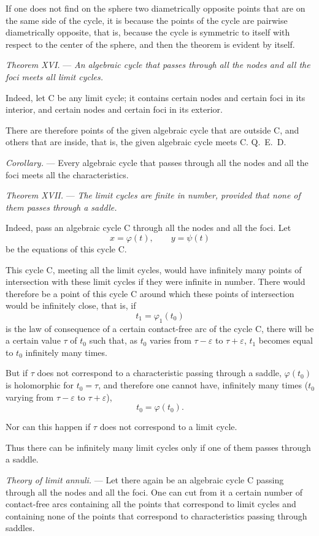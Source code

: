 \documentclass[11pt]{article}
\begin{document}
If one does not find on the sphere two diametrically opposite points that are on the same side of the cycle, it is because the points of the cycle are pairwise diametrically opposite, that is, because the cycle is symmetric to itself with respect to the center of the sphere, and then the theorem is evident by itself.

\emph{Theorem XVI.} --- \emph{An algebraic cycle that passes through all the nodes and all the foci meets all limit cycles.}

Indeed, let C be any limit cycle; it contains certain nodes and certain foci in its interior, and certain nodes and certain foci in its exterior.

There are therefore points of the given algebraic cycle that are outside C, and others that are inside, that is, the given algebraic cycle meets C. \hfill\mbox{Q. E. D.}

\emph{Corollary.} --- Every algebraic cycle that passes through all the nodes and all the foci meets all the characteristics.

\emph{Theorem XVII.} --- \emph{The limit cycles are finite in number, provided that none of them passes through a saddle.}

Indeed, pass an algebraic cycle C through all the nodes and all the foci. Let
\[
x=\varphi(t),\qquad y=\psi(t)
\]
be the equations of this cycle C.

This cycle C, meeting all the limit cycles, would have infinitely many points of intersection with these limit cycles if they were infinite in number. There would therefore be a point of this cycle C around which these points of intersection would be infinitely close, that is, if
\[
t_1=\varphi_1(t_0)
\]
is the law of consequence of a certain contact-free arc of the cycle C, there will be a certain value $\tau$ of $t_0$ such that, as $t_0$ varies from $\tau-\varepsilon$ to $\tau+\varepsilon$, $t_1$ becomes equal to $t_0$ infinitely many times.

But if $\tau$ does not correspond to a characteristic passing through a saddle, $\varphi(t_0)$ is holomorphic for $t_0=\tau$, and therefore one cannot have, infinitely many times ($t_0$ varying from $\tau-\varepsilon$ to $\tau+\varepsilon$),
\[
t_0=\varphi(t_0).
\]

Nor can this happen if $\tau$ does not correspond to a limit cycle.

Thus there can be infinitely many limit cycles only if one of them passes through a saddle.

\emph{Theory of limit annuli.} --- Let there again be an algebraic cycle C passing through all the nodes and all the foci. One can cut from it a certain number of contact-free arcs containing all the points that correspond to limit cycles and containing none of the points that correspond to characteristics passing through saddles.
\end{document}
